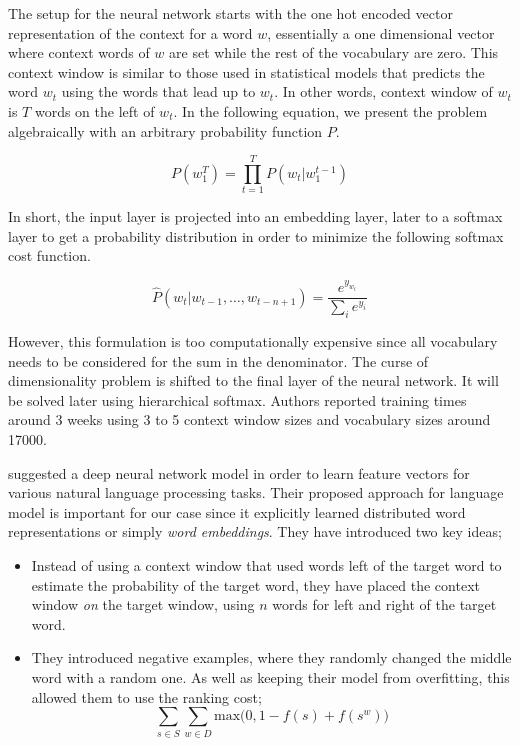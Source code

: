 The setup for the neural network starts with the one hot encoded vector representation of the context for a word $w$, essentially a one dimensional vector where context words of $w$ are set while the rest of the vocabulary are zero.
This context window is similar to those used in statistical models that predicts the word $w_t$ using the words that lead up to $w_t$.
In other words, context window of $w_t$ is $T$ words on the left of $w_t$.
In the following equation, we present the problem algebraically with an arbitrary probability function $P$.

\begin{displaymath}
    P(w_1^T) = \prod_{t=1}^{T}P(w_t | w_{1}^{t-1})
\end{displaymath}

In short, the input layer is projected into an embedding layer, later to a softmax layer to get a probability distribution in order to minimize the following softmax cost function.

\begin{equation}%
    \label{eqn:bengio_softmax}
    \hat{P}(w_t|w_{t-1}, \dots, w_{t-n+1}) = \frac{e^{y_{w_{t}}}}{\sum_{i}e^{y_{i}}}
\end{equation}

However, this formulation is too computationally expensive since all vocabulary needs to be considered for the sum in the denominator.
The curse of dimensionality problem is shifted to the final layer of the neural network.
It will be solved later using hierarchical softmax.
Authors reported training times around 3 weeks using 3 to 5 context window sizes and vocabulary sizes around 17000.

\textcite{collobert_unified_2008} suggested a deep neural network model in order to learn feature vectors for various natural language processing tasks.
Their proposed approach for language model is important for our case since it explicitly learned distributed word representations or simply \emph{word embeddings}.
They have introduced two key ideas;
\begin{itemize}
    \item Instead of using a context window that used words left of the target word to estimate the probability of the target word, they have placed the context window \emph{on} the target window, using $n$ words for left and right of the target word.
    \item They introduced negative examples, where they randomly changed the middle word with a random one. As well as keeping their model from overfitting, this allowed them to use the ranking cost;
        \begin{displaymath}
            \sum_{s \in S} \sum_{w \in D} \text{max}\big( 0, 1 - f(s) + f(s^w)\big)
        \end{displaymath}
\end{itemize}

